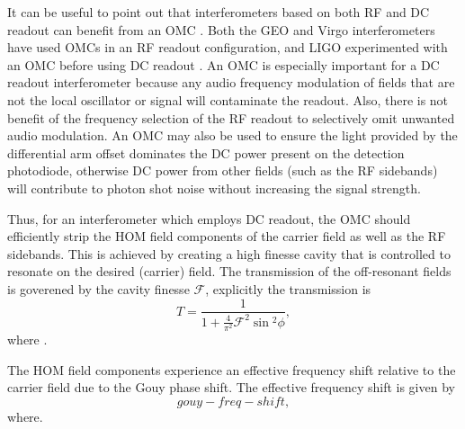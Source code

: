 It can be useful to point out that interferometers based on both RF and DC readout can benefit from an OMC . %
Both the GEO and Virgo interferometers have used OMCs in an RF readout configuration, and LIGO experimented with an OMC before using DC readout \cite{some things}. %
An OMC is especially important for a DC readout interferometer because any audio frequency modulation of fields that are not the local oscillator or signal will contaminate the readout. %
Also, there is not benefit of the frequency selection of the RF readout to selectively omit unwanted audio modulation. %
An OMC may also be used to ensure the light provided by the differential arm offset dominates the DC power present on the detection photodiode, otherwise DC power from other fields (such as the RF sidebands) will contribute to photon shot noise without increasing the signal strength. %


Thus, for an interferometer which employs DC readout, the OMC should efficiently strip the HOM field components of the carrier field as well as the RF sidebands. %
This is achieved by creating a high finesse cavity that is controlled to resonate on the desired (carrier) field. %
The transmission of the off-resonant fields is goverened by the cavity finesse $\mathcal{F}$, explicitly the transmission is
\begin{equation}
\label{eqn:finesse}
T=\frac{1}{1+\frac{4}{\pi^2}\mathcal{F}^2\sin{}^2\phi},
\end{equation}
where .

The HOM field components experience an effective frequency shift relative to the  carrier field due to the Gouy phase shift. %
The effective frequency shift is given by
\begin{equation}
\label{eqn:gouyshift}
gouy-freq-shift,
\end{equation}
where. %



